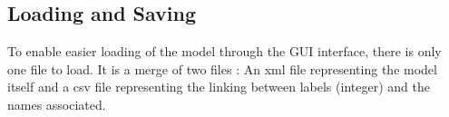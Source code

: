 \subsection{Loading and Saving}
To enable easier loading of the model through the GUI interface, there is only one file to load. It is a merge of two files : An xml file representing the model itself and a csv file representing the linking between labels (integer) and the names associated.
